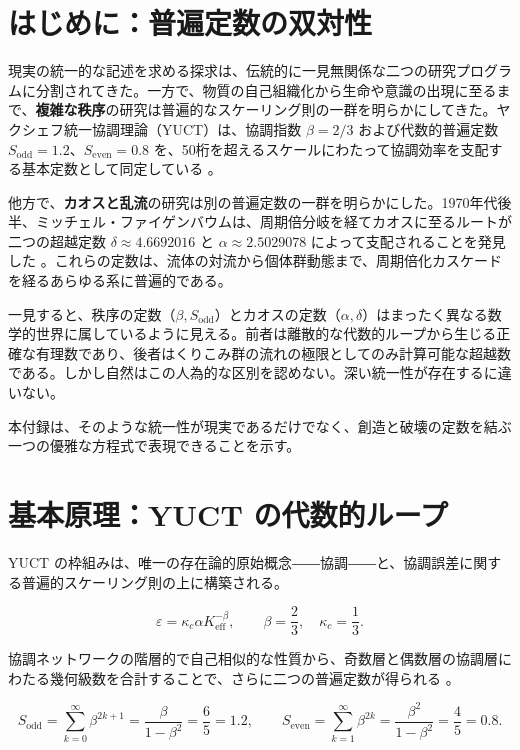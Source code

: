 \documentclass[11pt,a4paper]{article}
\begin{document}
	\section{はじめに：普遍定数の双対性}
	
	現実の統一的な記述を求める探求は、伝統的に一見無関係な二つの研究プログラムに分割されてきた。一方で、物質の自己組織化から生命や意識の出現に至るまで、\textbf{複雑な秩序}の研究は普遍的なスケーリング則の一群を明らかにしてきた。ヤクシェフ統一協調理論（YUCT）は、協調指数 \(\beta = 2/3\) および代数的普遍定数 \(S_{\mathrm{odd}} = 1.2\)、\(S_{\mathrm{even}} = 0.8\) を、50桁を超えるスケールにわたって協調効率を支配する基本定数として同定している \cite{Yakushev2026, AppendixAF}。
	
	他方で、\textbf{カオスと乱流}の研究は別の普遍定数の一群を明らかにした。1970年代後半、ミッチェル・ファイゲンバウムは、周期倍分岐を経てカオスに至るルートが二つの超越定数 \(\delta \approx 4.6692016\) と \(\alpha \approx 2.5029078\) によって支配されることを発見した \cite{Feigenbaum1978}。これらの定数は、流体の対流から個体群動態まで、周期倍化カスケードを経るあらゆる系に普遍的である。
	
	一見すると、秩序の定数（\(\beta, S_{\mathrm{odd}}\)）とカオスの定数（\(\alpha, \delta\)）はまったく異なる数学的世界に属しているように見える。前者は離散的な代数的ループから生じる正確な有理数であり、後者はくりこみ群の流れの極限としてのみ計算可能な超越数である。しかし自然はこの人為的な区別を認めない。深い統一性が存在するに違いない。
	
	本付録は、そのような統一性が現実であるだけでなく、創造と破壊の定数を結ぶ一つの優雅な方程式で表現できることを示す。
	
	\section{基本原理：YUCT の代数的ループ}
	
	YUCT の枠組みは、唯一の存在論的原始概念――協調――と、協調誤差に関する普遍的スケーリング則の上に構築される。
	
	\begin{equation}
		\varepsilon = \kappa_c \alpha K_{\mathrm{eff}}^{-\beta}, \qquad \beta = \frac{2}{3}, \quad \kappa_c = \frac{1}{3}.
	\end{equation}
	
	協調ネットワークの階層的で自己相似的な性質から、奇数層と偶数層の協調層にわたる幾何級数を合計することで、さらに二つの普遍定数が得られる \cite{AppendixFerra}。
	
	\begin{equation}
		S_{\mathrm{odd}} = \sum_{k=0}^{\infty} \beta^{2k+1} = \frac{\beta}{1-\beta^2} = \frac{6}{5} = 1.2, \qquad
		S_{\mathrm{even}} = \sum_{k=1}^{\infty} \beta^{2k} = \frac{\beta^2}{1-\beta^2} = \frac{4}{5} = 0.8.
	\end{equation}
	
\end{document}
